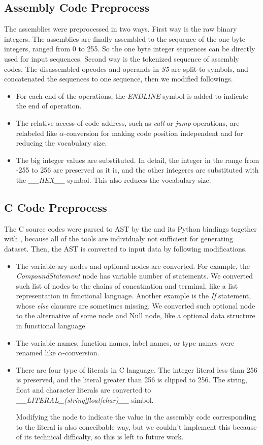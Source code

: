 \documentclass[senior,final,11pt]{iscs-thesis}
\begin{document}
\subsection{Assembly Code Preprocess}
The assemblies were preprocessed in two ways.
First way is the raw binary integers. The assemblies are finally assembled to the sequence of the one byte integers, ranged from 0 to 255.
So the one byte integer sequences can be directly used for input sequences.
Second way is the tokenized sequence of assembly codes. 
The disassembled opcodes and operands in {\sl S5} are split to symbols, and concatenated the sequences to one sequence, then we modified followings.
\begin{itemize}
\item For each end of the operations, the {\sl ENDLINE} symbol is added to indicate the end of operation.
\item 
The relative access of code address, such as {\sl call} or {\sl jump} operations, 
are relabeled like $\alpha$-conversion for making code position independent and for reducing the vocabulary size.
\item The big integer values are substituted. 
In detail, the integer in the range from -255 to 256 are preserved as it is, and the other integeres are substituted with the {\sl \_\_HEX\_\_} symbol.
This also reduces the vocabulary size.
\end{itemize}


\subsection{C Code Preprocess}
The C source codes were parsed to AST by the \cite{clang} and its Python bindings together with \cite{pycparser}, 
because all of the tools are individualy not sufficient for generating dataset.
Then, the AST is converted to input data by following modifications.

\begin{itemize}
\item The variable-ary nodes and optional nodes are converted. 
For example, the {\sl CompoundStatement} node has variable number of statements. 
We converted such list of nodes to the chains of concatnation and terminal, like a list representation in functional language.
Another example is the  {\sl If} statement, whose {\sl else} clausure are sometimes missing. 
We converted such optional node to the alternative of some node and Null node, like a optional data structure in functional language.
\item The variable names, function names, label names, or type names were renamed like $\alpha$-conversion.
\item There are four type of literals in C language. 
The integer literal less than 256 is preserved, and the literal greater than 256 is clipped to 256.
The string, float and character literals are converted to {\sl \_\_LITERAL\_(string|float|char)\_\_} simbol.

Modifying the node to indicate the value in the assembly code corresponding to the literal is also conceibable way,
but we couldn't implement this because of its technical difficalty, so this is left to future work.
\end{itemize}
\end{document}
